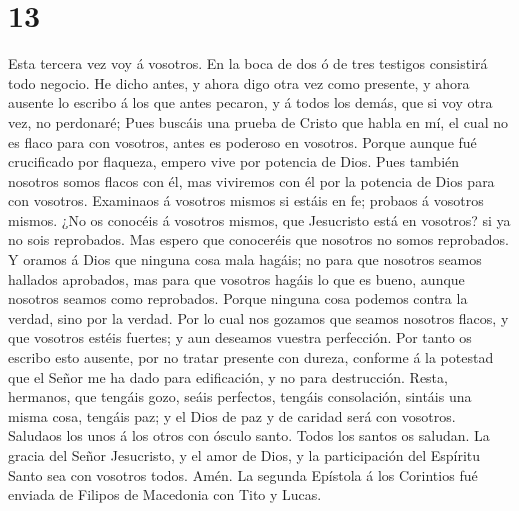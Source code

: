 \hypertarget{section-12}{%
\section{13}\label{section-12}}

 Esta tercera vez voy á vosotros. En la boca de dos ó de
tres testigos consistirá todo negocio.  He dicho antes, y
ahora digo otra vez como presente, y ahora ausente lo escribo á los que
antes pecaron, y á todos los demás, que si voy otra vez, no perdonaré;
 Pues buscáis una prueba de Cristo que habla en mí, el
cual no es flaco para con vosotros, antes es poderoso en vosotros.
 Porque aunque fué crucificado por flaqueza, empero vive
por potencia de Dios. Pues también nosotros somos flacos con él, mas
viviremos con él por la potencia de Dios para con vosotros.
 Examinaos á vosotros mismos si estáis en fe; probaos á
vosotros mismos. ¿No os conocéis á vosotros mismos, que Jesucristo está
en vosotros? si ya no sois reprobados.  Mas espero que
conoceréis que nosotros no somos reprobados.  Y oramos á
Dios que ninguna cosa mala hagáis; no para que nosotros seamos hallados
aprobados, mas para que vosotros hagáis lo que es bueno, aunque nosotros
seamos como reprobados.  Porque ninguna cosa podemos
contra la verdad, sino por la verdad.  Por lo cual nos
gozamos que seamos nosotros flacos, y que vosotros estéis fuertes; y aun
deseamos vuestra perfección.  Por tanto os escribo esto
ausente, por no tratar presente con dureza, conforme á la potestad que
el Señor me ha dado para edificación, y no para destrucción.
 Resta, hermanos, que tengáis gozo, seáis perfectos,
tengáis consolación, sintáis una misma cosa, tengáis paz; y el Dios de
paz y de caridad será con vosotros.  Saludaos los unos á
los otros con ósculo santo. Todos los santos os saludan. 
La gracia del Señor Jesucristo, y el amor de Dios, y la participación
del Espíritu Santo sea con vosotros todos. Amén. La segunda Epístola á
los Corintios fué enviada de Filipos de Macedonia con Tito y Lucas.
